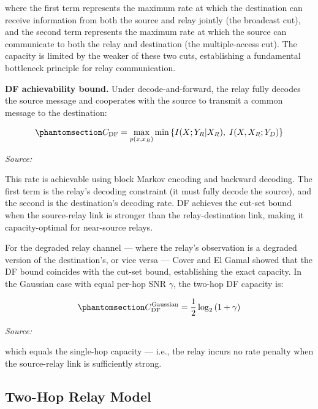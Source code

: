 where the first term represents the maximum rate at which the destination can receive information from both the source and relay jointly (the broadcast cut), and the second term represents the maximum rate at which the source can communicate to both the relay and destination (the multiple-access cut). The capacity is limited by the weaker of these two cuts, establishing a fundamental bottleneck principle for relay communication.

\textbf{DF achievability bound.} Under decode-and-forward, the relay fully decodes the source message and cooperates with the source to transmit a common message to the destination:

\begin{equation}\protect\phantomsection\label{eq:df-capacity}{C_{\text{DF}} = \max_{p(x, x_R)} \min\left\{I(X; Y_R | X_R), \; I(X, X_R; Y_D)\right\}
}\end{equation} \par{\small\textit{Source: \cite{cover1979capacity}}}

This rate is achievable using block Markov encoding and backward decoding. The first term is the relay's decoding constraint (it must fully decode the source), and the second is the destination's decoding rate. DF achieves the cut-set bound when the source-relay link is stronger than the relay-destination link, making it capacity-optimal for near-source relays.

For the degraded relay channel --- where the relay's observation is a degraded version of the destination's, or vice versa --- Cover and El Gamal showed that the DF bound coincides with the cut-set bound, establishing the exact capacity. In the Gaussian case with equal per-hop SNR \(\gamma\), the two-hop DF capacity is:

\begin{equation}\protect\phantomsection\label{eq:df-gaussian-capacity}{C_{\text{DF}}^{\text{Gaussian}} = \frac{1}{2}\log_2\left(1 + \gamma\right)
}\end{equation} \par{\small\textit{Source: \cite{laneman2004cooperative, cover1979capacity}}}

which equals the single-hop capacity --- i.e., the relay incurs no rate penalty when the source-relay link is sufficiently strong.

\subsection{Two-Hop Relay Model}\label{sec:two-hop-relay-model}

